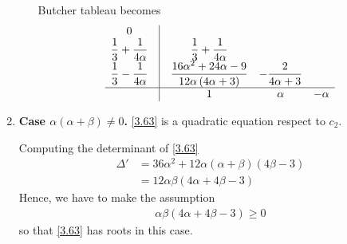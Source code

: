 \documentclass[a4paper,oneside]{book}
\numberwithin{equation}{chapter}
\begin{document}
\begin{enumerate}
\begin{enumerate}
Butcher tableau becomes
\begin{align}
\begin{array}{*{20}{c}}
0&\vline& {}&{}&{}\\
{\dfrac{1}{3} + \dfrac{1}{{4\alpha }}}&\vline& {\dfrac{1}{3} + \dfrac{1}{{4\alpha }}}&{}&{}\\
{\dfrac{1}{3} - \dfrac{1}{{4\alpha }}}&\vline& {\dfrac{{16{\alpha ^2} + 24\alpha  - 9}}{{12\alpha \left( {4\alpha  + 3} \right)}}}&{ - \dfrac{2}{{4\alpha  + 3}}}&{}\\
\hline
{}&\vline& 1&\alpha &{ - \alpha }
\end{array}
\end{align}
\end{enumerate}
\item \textbf{Case $\alpha \left( {\alpha  + \beta } \right)\ne 0$.} \eqref{3.63} is a quadratic equation respect to $c_2$.

Computing the determinant of \eqref{3.63}
\begin{align}
\Delta ' &= 36{\alpha ^2} + 12\alpha \left( {\alpha  + \beta } \right)\left( {4\beta  - 3} \right)\\
 &= 12\alpha \beta \left( {4\alpha  + 4\beta  - 3} \right)
\end{align}
Hence, we have to make the assumption 
\begin{align}
\alpha \beta \left( {4\alpha  + 4\beta  - 3} \right) \ge 0
\end{align}
so that \eqref{3.63} has roots in this case.


\end{enumerate}
\end{document}
